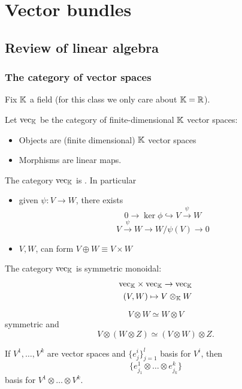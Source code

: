 \chapter{Vector bundles}

\section{Review of linear algebra}

\subsection{The category of vector spaces}

Fix \(\mathbb{K}\) a field (for this class we only care about \(\mathbb{K}=\mathbb{R}\)).

Let \(\text{vec}_{\mathbb{K}}\) be the category of finite-dimensional \(\mathbb{K}\) vector spaces:
\begin{itemize}
    \item Objects are (finite dimensional) \(\mathbb{K}\) vector spaces 
    \item Morphisms are linear maps.
\end{itemize}

The category \(\text{vec}_{\mathbb{K}}\) is . In particular 
\begin{itemize}
    \item given \(\psi:V\to W\), there exists \[0\to \ker \phi \hookrightarrow V\stackrel{\psi}{\to} W\]
         \[V\stackrel{\psi}{\to} W\to W/\psi(V)\to 0\] %
    \item \(V,W\), can form \(V\oplus W \equiv V\times W\) 
\end{itemize}

The category \(\text{vec}_{\mathbb{K}}\) is symmetric monoidal:
\begin{align*}
    \text{vec}_{\mathbb{K}} \times \text{vec}_{\mathbb{K}} \to \text{vec}_{\mathbb{K}}\\
    (V,W)\mapsto V \otimes_{\mathbb{K}} W
\end{align*}

 \[V\otimes W \simeq W\otimes V\] symmetric and 
\[V\otimes(W\otimes Z)\simeq (V\otimes W)\otimes Z.\]

 If \(V^1,\dots, V^k\) are vector spaces and \(\{e_j^i\}_{j=1}^l\) basis for \(V^i\), 
then \[\{e_{j_1}^1\otimes\dots\otimes e_{j_k}^k\}\]
basis for \(V^1\otimes \dots\otimes V^k\).

